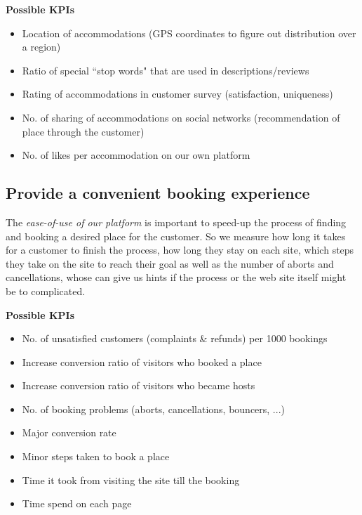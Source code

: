 \begin{description}
	\item \textbf{Possible KPIs}
	\begin{itemize}
    	\item Location of accommodations (GPS coordinates to figure out distribution over a region)
        \item Ratio of special ``stop words" that are used in descriptions/reviews
        \item Rating of accommodations in customer survey (satisfaction, uniqueness)
        \item No. of sharing of accommodations on social networks (recommendation of place through the customer)
        \item No. of likes per accommodation on our own platform         
    \end{itemize}
\end{description}


\subsection{Provide a convenient booking experience}
The \textit{ease-of-use of our platform} is important to speed-up the process of finding and booking a desired place for the customer. So we measure how long it takes for a customer to finish the process, how long they stay on each site, which steps they take on the site to reach their goal as well as the number of aborts and cancellations, whose can give us hints if the process or the web site itself might be to complicated. 

\begin{description}
	\item \textbf{Possible KPIs}
	\begin{itemize}
    	\item No. of unsatisfied customers (complaints \& refunds) per 1000 bookings
        \item Increase conversion ratio of visitors who booked a place
        \item Increase conversion ratio of visitors who became hosts
        \item No. of booking problems (aborts, cancellations, bouncers, ...)
        \item Major conversion rate 
        \item Minor steps taken to book a place 
        \item Time it took from visiting the site till the booking
        \item Time spend on each page 
    \end{itemize}
\end{description}

